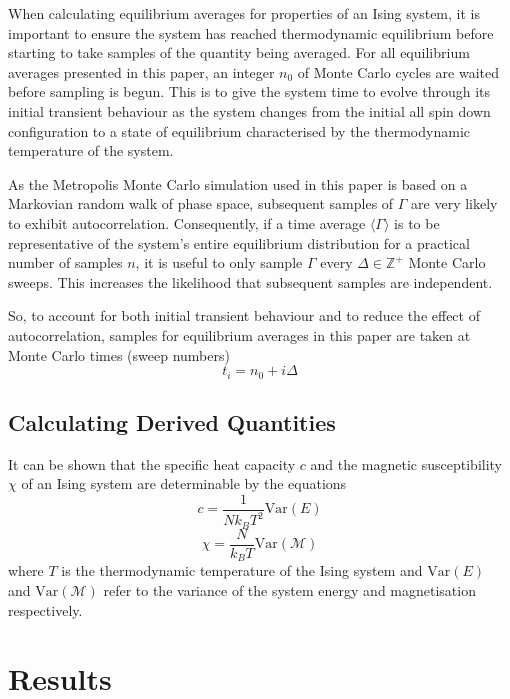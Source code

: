 \documentclass[11pt]{iopart}
\begin{document}
When calculating equilibrium averages for properties of an Ising system, it is important to ensure the system has reached thermodynamic equilibrium before starting to take samples of the quantity being averaged. For all equilibrium averages presented in this paper, an integer $n_0$ of Monte Carlo cycles are waited before sampling is begun. This is to give the system time to evolve through its initial transient behaviour as the system changes from the initial all spin down configuration to a state of equilibrium characterised by the thermodynamic temperature of the system.

As the Metropolis Monte Carlo simulation used in this paper is based on a Markovian random walk of phase space, subsequent samples of $\Gamma$ are very likely to exhibit autocorrelation. Consequently, if a time average $\langle \Gamma \rangle$ is to be representative of the system's entire equilibrium distribution for a practical number of samples $n$, it is useful to only sample $\Gamma$ every $\Delta \in \mathbb{Z}^{+}$ Monte Carlo sweeps. This increases the likelihood that subsequent samples are independent.

So, to account for both initial transient behaviour and to reduce the effect of autocorrelation, samples for equilibrium averages in this paper are taken at Monte Carlo times (sweep numbers)
\begin{equation}
\label{eq:samples}
t_i = n_0 + i \Delta
\end{equation}  

\subsection{Calculating Derived Quantities}

It can be shown that the specific heat capacity $c$ and the magnetic susceptibility $\chi$ of an Ising system are determinable by the equations \cite{handout}
\begin{equation}
c = \frac{1}{N k_B T^2} \textrm{Var}(E)
\end{equation}
\begin{equation}
\chi = \frac{N}{k_B T} \textrm{Var}({\mathcal{M}})
\end{equation}
where $T$ is the thermodynamic temperature of the Ising system and $\textrm{Var}(E)$ and $\textrm{Var}(\mathcal{M})$ refer to the variance of the system energy and magnetisation respectively.

\section{Results}
\end{document}
